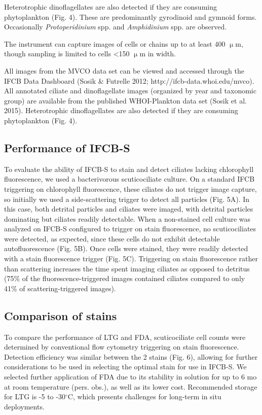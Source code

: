 Heterotrophic dinoflagellates are also detected if they are consuming phytoplankton (Fig. 4). These are predominantly gyrodinoid and gymnoid forms. Occasionally \textit{Protoperidinium} spp. and \textit{Amphidinium} spp. are observed.

The instrument can capture images of cells or chains up to at least 400 $\upmu$m, though sampling is limited to cells <150 $\upmu$m in width.

All images from the MVCO data set can be viewed and accessed through the IFCB Data Dashboard (Sosik \& Futrelle 2012; http://ifcb-data.whoi.edu/mvco). All annotated ciliate and dinoflagellate images (organized by year and taxonomic group) are available from the published WHOI-Plankton data set (Sosik et al. 2015). Heterotrophic dinoflagellates are also detected if they are consuming phytoplankton (Fig. 4). 

\subsection{Performance of IFCB-S}
To evaluate the ability of IFCB-S to stain and detect ciliates lacking chlorophyll fluorescence, we used a bacterivorous scuticociliate culture. On a standard IFCB triggering on chlorophyll fluorescence, these ciliates do not trigger image capture, so initially we used a side-scattering trigger to detect all particles (Fig. 5A). In this case, both detrital particles and ciliates were imaged, with detrital particles dominating but ciliates readily detectable. When a non-stained cell culture was analyzed on IFCB-S configured to trigger on stain fluorescence, no scuticociliates were detected, as expected, since these cells do not exhibit detectable autofluorescence (Fig. 5B). Once cells were stained, they were readily detected with a stain fluorescence trigger (Fig. 5C). Triggering on stain fluorescence rather than scattering increases the time spent imaging ciliates as opposed to detritus (75\% of the fluorescence-triggered images contained ciliates compared to only 41\% of scattering-triggered images).

\subsection{Comparison of stains}
To compare the performance of LTG and FDA, scuticociliate cell counts were determined by conventional flow cytometry triggering on stain fluorescence. Detection efficiency was similar between the 2 stains (Fig. 6), allowing for further considerations to be used in selecting the optimal stain for use in IFCB-S. We selected further application of FDA due to its stability in solution for up to 6 mo at room temperature (pers. obs.), as well as its lower cost. Recommended storage for LTG is -5 to -30$^{\circ}$C, which presents challenges for long-term in situ deployments.

